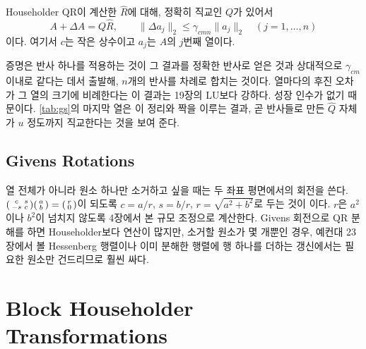 \begin{theorem}
\label{thm:householder-backward}
Householder QR이 계산한 $\hat R$에 대해, 정확히 직교인 $Q$가 있어서
\[
A+\Delta A=Q\hat R,\qquad\|\Delta a_j\|_2\le\gamma_{cmn}\|a_j\|_2\quad(j=1,\dots,n)
\]
이다. 여기서 $c$는 작은 상수이고 $a_j$는 $A$의 $j$번째 열이다.
\end{theorem}

증명은 반사 하나를 적용하는 것이 그 결과를 정확한 반사로 얻은 것과 상대적으로 $\gamma_{cm}$ 이내로 같다는 데서 출발해, $n$개의 반사를 차례로 합치는 것이다\cite{higham2002accuracy}. 열마다의 후진 오차가 그 열의 크기에 비례한다는 이 결과는 19장의 LU보다 강하다. 성장 인수가 없기 때문이다. \cref{tab:gs}의 마지막 열은 이 정리와 짝을 이루는 결과, 곧 반사들로 만든 $\hat Q$ 자체가 $u$ 정도까지 직교한다는 것을 보여 준다.

\subsection{Givens Rotations}

열 전체가 아니라 원소 하나만 소거하고 싶을 때는 두 좌표 평면에서의 회전을 쓴다. $\begin{psmallmatrix}c&s\\-s&c\end{psmallmatrix}\begin{psmallmatrix}a\\b\end{psmallmatrix}=\begin{psmallmatrix}r\\0\end{psmallmatrix}$이 되도록 $c=a/r$, $s=b/r$, $r=\sqrt{a^2+b^2}$로 두는 것이 이다\cite{givens1958}. $r$은 $a^2$이나 $b^2$이 넘치지 않도록 4장에서 본 규모 조정으로 계산한다. Givens 회전으로 QR 분해를 하면 Householder보다 연산이 많지만, 소거할 원소가 몇 개뿐인 경우, 예컨대 23장에서 볼 Hessenberg 행렬이나 이미 분해한 행렬에 행 하나를 더하는 갱신에서는 필요한 원소만 건드리므로 훨씬 싸다.

\section{Block Householder Transformations}
\label{sec:compact-wy}

